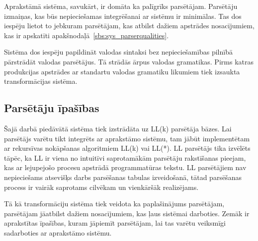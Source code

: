 Aprakstāmā sistēma, savukārt, ir domāta ka palīgrīks parsētājam. Parsētāju izmaiņas, kas būs nepieciešamas integrēšanai ar sistēmu ir minimālas. Tas dos iespēju lietot to jebkuram parsētājam, kas atbilst dažiem apstrādes nosacījumiem, kas ir apskatīti apakšnodaļā~\ref{sbs:sys_parserqualities}.

Sistēma dos iespēju papildināt valodas sintaksi bez nepieciešamības pilnībā pārstrādāt valodas parsētājus. Tā strādās ārpus valodas gramatikas. Pirms katras produkcijas apstrādes ar standartu valodas gramatiku likumiem tiek izsaukta transformācijas sistēma. 


\subsection{\label{sbs:sys_parserqualities}Parsētāju īpašības}

Šajā darbā piedāvātā sistēma tiek izstrādāta uz LL(k) parsētāja bāzes. Lai parsētājs varētu tikt integrēts ar aprakstāmo sistēmu, tam jābūt implementētam ar rekursīvas nokāpšanas algoritmiem LL(k) vai LL(*). LL parsētājs tika izvēlēts tāpēc, ka LL ir viena no intuitīvi saprotamākām parsētāju rakstīšanas pieejam, kas ar lejupejošo procesu apstrādā programmatūras tekstu. LL parsētājiem nav nepieciešams atsevišķs darbs parsēšanas tabulas izveidošanā, tātad parsēšanas process ir vairāk saprotams cilvēkam un vienkāršāk realizējams.

Tā kā transformāciju sistēma tiek veidota ka paplašinājums parsētājam, parsētājam jāatbilst dažiem nosacījumiem, kas ļaus sistēmai darboties. Zemāk ir aprakstītas īpašības, kuram jāpiemīt parsētājam, lai tas varētu veiksmīgi sadarboties ar aprakstāmo sistēmu.

